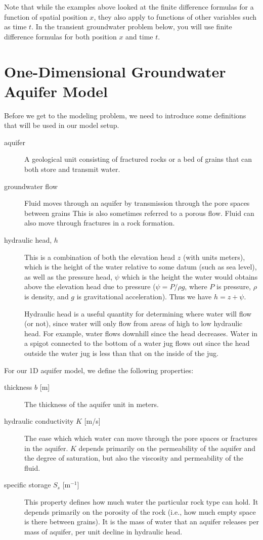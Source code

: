 \documentclass[11pt, oneside]{article}   	%
\begin{document}
Note that while the examples above  looked at the finite difference formulas for a function of spatial position $x$, they also apply to functions of other variables such as time $t$. In the transient groundwater problem below, you will use finite difference formulas for both position $x$ and time $t$.

\section*{One-Dimensional Groundwater Aquifer Model}
Before we get to the modeling problem, we need to introduce some definitions that will be used in our model setup. 

 \begin{description}
\item[aquifer ] A geological unit consisting of fractured rocks or a bed of grains that can both store and transmit water.
\item[groundwater flow ]  Fluid moves through an aquifer by transmission through the pore spaces between  grains  This is also sometimes  referred to a porous flow. Fluid can also move  through  fractures in a  rock formation.  
\item[hydraulic head, $h$   ]  This is a combination of both the elevation head $z$ (with units meters), which is the height of the water relative to some datum (such as sea level), as well as the pressure head, $\psi$ which is the height the water would obtains above the elevation head due to pressure ($\psi = P/\rho g$, where $P$ is pressure, $\rho$ is density, and $g$ is gravitational acceleration).  Thus we have $h = z + \psi$.

Hydraulic head is a useful quantity for determining where water will flow (or not), since water will only flow from areas of high  to low hydraulic head. For example, water flows downhill since the head decreases. Water in  a spigot connected to the bottom of a water jug flows out since the head outside the water jug is less than that on the inside of the jug.
\end{description}

For our 1D aquifer model, we define the following properties:
\begin{description}
\item[thickness $b$  {\rm [m]}]  The thickness of the aquifer unit in meters.
\item[hydraulic conductivity $K$ {\rm [m/s]} ]  The ease which which water can move through the pore spaces or fractures in the aquifer.  $K$ depends primarily on the permeability of the aquifer and the degree of saturation, but also the viscosity and permeability of the fluid.
\item [specific storage $S_s$ {\rm [m$^{-1}$]}] This property defines how much water the particular rock type can hold. It depends primarily on the porosity of the rock (i.e., how much empty space is there between grains). It is  the mass of water that an aquifer releases per mass of aquifer, per unit decline in hydraulic head.
\end{description}
\end{document}
